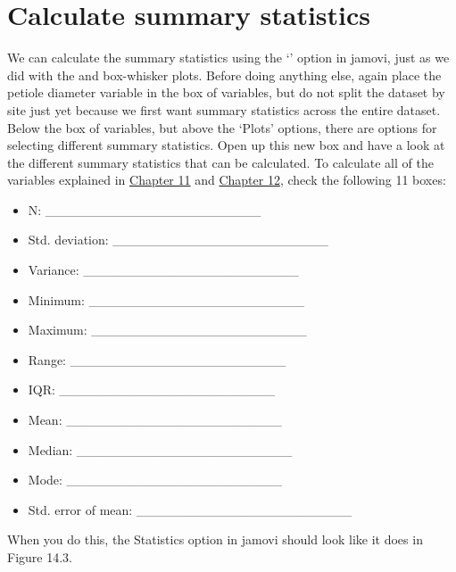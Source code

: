 \documentclass[
  openany]{krantz}
\providecommand{\tightlist}{%
  \setlength{\itemsep}{0pt}\setlength{\parskip}{0pt}}
\begin{document}
\hypertarget{calculate-summary-statistics}{%
\section{Calculate summary statistics}\label{calculate-summary-statistics}}

We can calculate the summary statistics using the `' option in jamovi, just as we did with the  and box-whisker plots.
Before doing anything else, again place the petiole diameter variable in the box of variables, but do not split the dataset by site just yet because we first want summary statistics across the entire dataset.
Below the box of variables, but above the `Plots' options, there are options for selecting different summary statistics.
Open up this new box and have a look at the different summary statistics that can be calculated.
To calculate all of the variables explained in \protect\hyperlink{Chapter_11}{Chapter 11} and \protect\hyperlink{Chapter_12}{Chapter 12}, check the following 11 boxes:

\begin{itemize}
\tightlist
\item
  N: \_\_\_\_\_\_\_\_\_\_\_\_\_\_\_\_\_\_\_\_\_\_\_
\item
  Std. deviation: \_\_\_\_\_\_\_\_\_\_\_\_\_\_\_\_\_\_\_\_\_\_\_
\item
  Variance: \_\_\_\_\_\_\_\_\_\_\_\_\_\_\_\_\_\_\_\_\_\_\_
\item
  Minimum: \_\_\_\_\_\_\_\_\_\_\_\_\_\_\_\_\_\_\_\_\_\_\_
\item
  Maximum: \_\_\_\_\_\_\_\_\_\_\_\_\_\_\_\_\_\_\_\_\_\_\_
\item
  Range: \_\_\_\_\_\_\_\_\_\_\_\_\_\_\_\_\_\_\_\_\_\_\_
\item
  IQR: \_\_\_\_\_\_\_\_\_\_\_\_\_\_\_\_\_\_\_\_\_\_\_
\item
  Mean: \_\_\_\_\_\_\_\_\_\_\_\_\_\_\_\_\_\_\_\_\_\_\_
\item
  Median: \_\_\_\_\_\_\_\_\_\_\_\_\_\_\_\_\_\_\_\_\_\_\_
\item
  Mode: \_\_\_\_\_\_\_\_\_\_\_\_\_\_\_\_\_\_\_\_\_\_\_
\item
  Std. error of mean: \_\_\_\_\_\_\_\_\_\_\_\_\_\_\_\_\_\_\_\_\_\_\_
\end{itemize}

When you do this, the Statistics option in jamovi should look like it does in Figure 14.3.
\end{document}

